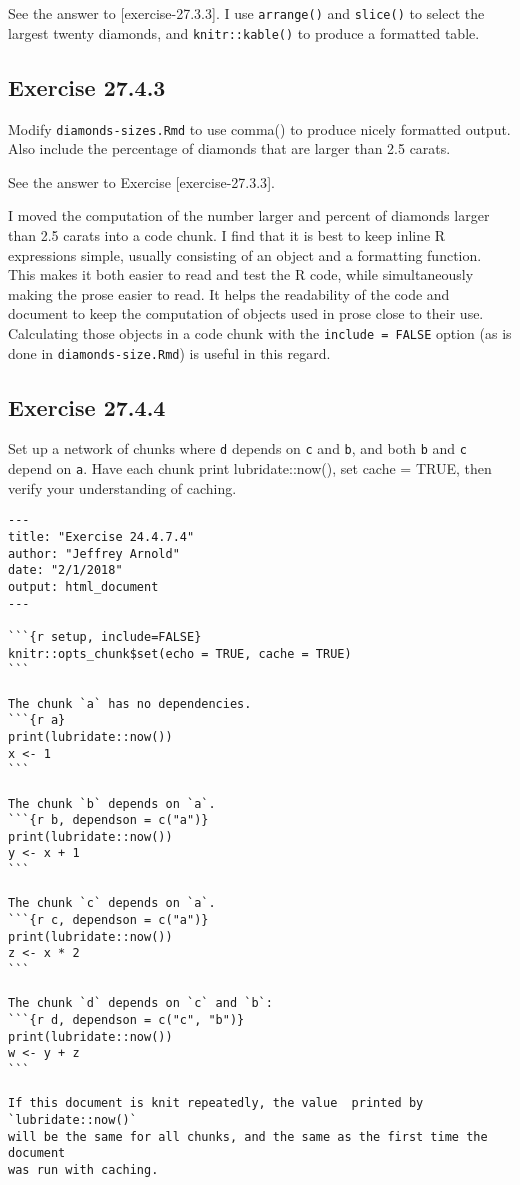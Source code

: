 \documentclass[]{book}
\theoremstyle{plain}
\theoremstyle{remark}
\begin{document}
See the answer to {[}exercise-27.3.3{]}. I use \texttt{arrange()} and
\texttt{slice()} to select the largest twenty diamonds, and
\texttt{knitr::kable()} to produce a formatted table.

\hypertarget{exercise-27.4.3}{%
\subsection*{\texorpdfstring{Exercise
{27.4.3}}{Exercise 27.4.3}}\label{exercise-27.4.3}}

Modify \texttt{diamonds-sizes.Rmd} to use comma() to produce nicely
formatted output. Also include the percentage of diamonds that are
larger than 2.5 carats.

See the answer to Exercise {[}exercise-27.3.3{]}.

I moved the computation of the number larger and percent of diamonds
larger than 2.5 carats into a code chunk. I find that it is best to keep
inline R expressions simple, usually consisting of an object and a
formatting function. This makes it both easier to read and test the R
code, while simultaneously making the prose easier to read. It helps the
readability of the code and document to keep the computation of objects
used in prose close to their use. Calculating those objects in a code
chunk with the \texttt{include\ =\ FALSE} option (as is done in
\texttt{diamonds-size.Rmd}) is useful in this regard.

\hypertarget{exercise-27.4.4}{%
\subsection*{\texorpdfstring{Exercise
{27.4.4}}{Exercise 27.4.4}}\label{exercise-27.4.4}}

Set up a network of chunks where \texttt{d} depends on \texttt{c} and
\texttt{b}, and both \texttt{b} and \texttt{c} depend on \texttt{a}.
Have each chunk print lubridate::now(), set cache = TRUE, then verify
your understanding of caching.

\begin{verbatim}
---
title: "Exercise 24.4.7.4"
author: "Jeffrey Arnold"
date: "2/1/2018"
output: html_document
---

```{r setup, include=FALSE}
knitr::opts_chunk$set(echo = TRUE, cache = TRUE)
```

The chunk `a` has no dependencies.
```{r a}
print(lubridate::now())
x <- 1
```

The chunk `b` depends on `a`.
```{r b, dependson = c("a")}
print(lubridate::now())
y <- x + 1
```

The chunk `c` depends on `a`.
```{r c, dependson = c("a")}
print(lubridate::now())
z <- x * 2
```

The chunk `d` depends on `c` and `b`:
```{r d, dependson = c("c", "b")}
print(lubridate::now())
w <- y + z
```

If this document is knit repeatedly, the value  printed by `lubridate::now()` 
will be the same for all chunks, and the same as the first time the document
was run with caching.
\end{verbatim}
\end{document}
